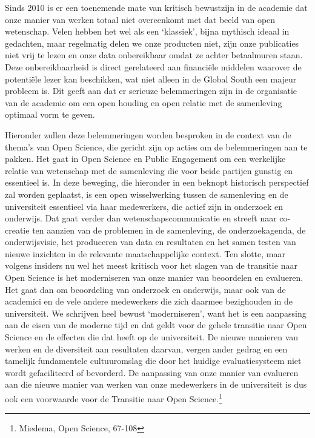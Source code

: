 \documentclass[empirical, authordate, ]{new-jote-article}
\begin{document}
	Sinds 2010 is er een toenemende mate van kritisch bewustzijn in de academie dat onze manier van werken totaal niet overeenkomt met dat beeld van open wetenschap. Velen hebben het wel als een ‘klassiek', bijna mythisch ideaal in gedachten, maar regelmatig delen we onze producten niet, zijn onze publicaties niet vrij te lezen en onze data onbereikbaar omdat ze achter betaalmuren staan. Deze onbereikbaarheid is direct gerelateerd aan financiële middelen waarover de potentiële lezer kan beschikken, wat niet alleen in de Global South een majeur probleem is. Dit geeft aan dat er serieuze belemmeringen zijn in de organisatie van de academie om een open houding en open relatie met de samenleving optimaal vorm te geven.



	Hieronder zullen deze belemmeringen worden besproken in de context van de thema's van Open Science, die gericht zijn op acties om de belemmeringen aan te pakken. Het gaat in Open Science en Public Engagement om een werkelijke relatie van wetenschap met de samenleving die voor beide partijen gunstig en essentieel is. In deze beweging, die hieronder in een beknopt historisch perspectief zal worden geplaatst, is een open wisselwerking tussen de samenleving en de universiteit essentieel via haar medewerkers, die actief zijn in onderzoek en onderwijs. Dat gaat verder dan wetenschapscommunicatie en streeft naar co-creatie ten aanzien van de problemen in de samenleving, de onderzoekagenda, de onderwijsvisie, het produceren van data en resultaten en het samen testen van nieuwe inzichten in de relevante maatschappelijke context. Ten slotte, maar volgens insiders nu wel het meest kritisch voor het slagen van de transitie naar Open Science is het moderniseren van onze manier van beoordelen en evalueren. Het gaat dan om beoordeling van onderzoek en onderwijs, maar ook van de academici en de vele andere medewerkers die zich daarmee bezighouden in de universiteit. We schrijven heel bewust ‘moderniseren', want het is een aanpassing aan de eisen van de moderne tijd en dat geldt voor de gehele transitie naar Open Science en de effecten die dat heeft op de universiteit. De nieuwe manieren van werken en de diversiteit aan resultaten daarvan, vergen ander gedrag en een tamelijk fundamentele cultuuromslag die door het huidige evaluatiesysteem niet wordt gefaciliteerd of bevorderd. De aanpassing van onze manier van evalueren aan die nieuwe manier van werken van onze medewerkers in de universiteit is dus ook een voorwaarde voor de Transitie naar Open Science.\footnote{Miedema, Open Science, 67-108}
\end{document}
